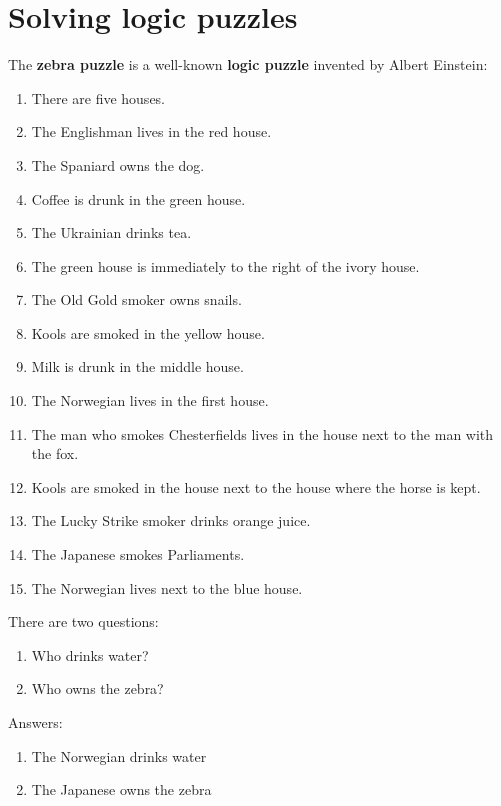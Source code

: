 \documentclass{report}
\begin{document}
\section{Solving logic puzzles}
The {\bf zebra puzzle} is a well-known {\bf logic puzzle} invented by Albert Einstein:

\begin{enumerate}
\item There are five houses.
\item The Englishman lives in the red house.
\item The Spaniard owns the dog.
\item Coffee is drunk in the green house.
\item The Ukrainian drinks tea.
\item The green house is immediately to the right of the ivory house.
\item The Old Gold smoker owns snails.
\item Kools are smoked in the yellow house.
\item Milk is drunk in the middle house.
\item The Norwegian lives in the first house.
\item The man who smokes Chesterfields lives in the house next to the man with the fox.
\item Kools are smoked in the house next to the house where the horse is kept.
\item The Lucky Strike smoker drinks orange juice.
\item The Japanese smokes Parliaments.
\item The Norwegian lives next to the blue house.
\end{enumerate}

There are two questions:
\begin{enumerate}
\item Who drinks water?
\item Who owns the zebra?
\end{enumerate}

Answers:
\begin{enumerate}
\item The Norwegian drinks water
\item The Japanese owns the zebra
\end{enumerate}
\end{document}

